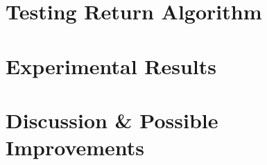 \documentclass[11pt, a4paper]{article}
\begin{document}
\section{Testing Return Algorithm}
\label{Testing Return Algorithm}




\section{Experimental Results}
\label{Results}


\section{Discussion \& Possible Improvements}
\label{Discussion}


\end{document}
